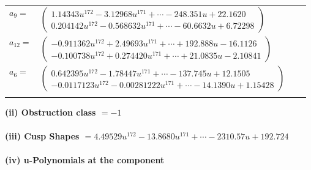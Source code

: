 \documentclass[1p]{elsarticle_modified}
\theoremstyle{definition}
\begin{document}
\begin{tabular}{m{7pt} m{180pt} m{7pt} m{180pt} }
\flushright $a_{9}=$&$\begin{pmatrix}1.14343 u^{172}-3.12968 u^{171}+\cdots-248.351 u+22.1620\\0.204142 u^{172}-0.568632 u^{171}+\cdots-60.6632 u+6.72298\end{pmatrix}$ \\
\flushright $a_{12}=$&$\begin{pmatrix}-0.911362 u^{172}+2.49693 u^{171}+\cdots+192.888 u-16.1126\\-0.100738 u^{172}+0.274420 u^{171}+\cdots+21.0835 u-2.10841\end{pmatrix}$ \\
\flushright $a_{6}=$&$\begin{pmatrix}0.642395 u^{172}-1.78447 u^{171}+\cdots-137.745 u+12.1505\\-0.0117123 u^{172}-0.00281222 u^{171}+\cdots-14.1390 u+1.15428\end{pmatrix}$\\&\end{tabular}
\flushleft \textbf{(ii) Obstruction class $= -1$}\\~\\
\flushleft \textbf{(iii) Cusp Shapes $= 4.49529 u^{172}-13.8680 u^{171}+\cdots-2310.57 u+192.724$}\\~\\
\newpage\renewcommand{\arraystretch}{1}
\flushleft \textbf{(iv) u-Polynomials at the component}\newline \\
\end{document}

